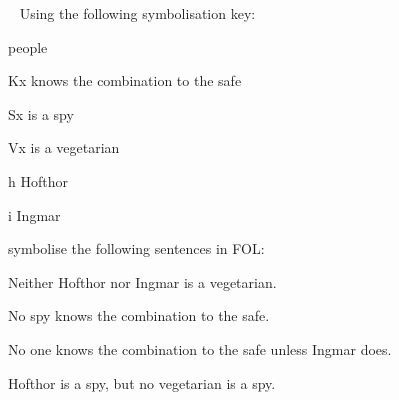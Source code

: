\
\problempart
\label{pr.FOLvegetarians}
Using the following symbolisation key:
\begin{ekey}
\item[\text{domain}] people
\item[Kx]  knows the combination to the safe
\item[Sx]  is a spy
\item[Vx] \gap{x} is a vegetarian
\item[h] Hofthor
\item[i] Ingmar
\end{ekey}
symbolise the following sentences in FOL:
\begin{earg}
\item Neither Hofthor nor Ingmar is a vegetarian.
\item[] 
\item No spy knows the combination to the safe.
\item[] 
\item No one knows the combination to the safe unless Ingmar does.
\item[] \myanswer{$\forall x \enot Kx \eor Ki$}
\item Hofthor is a spy, but no vegetarian is a spy.
\item[] 
\end{earg}

